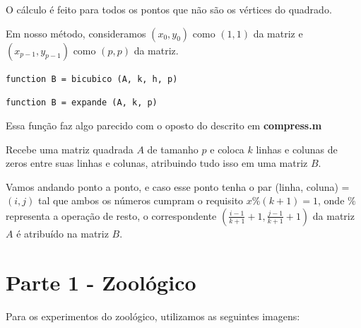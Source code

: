 \documentclass[12pt,letterpaper]{article}
\begin{document}
	O cálculo é feito para todos os pontos que não são os vértices do quadrado. 
	
	Em nosso método, consideramos $(x_0, y_0)$ como $(1, 1)$ da matriz e $(x_{p-1}, y_{p-1})$ como $(p, p)$ da matriz.
	 
	\begin{center}
		\texttt{function B = bicubico (A, k, h, p)}
	\end{center}
	
	\begin{center}
		\texttt{function B = expande (A, k, p)}
	\end{center}
	
	Essa função faz algo parecido com o oposto do descrito em \textbf{compress.m}
	
	Recebe uma matriz quadrada $A$ de tamanho $p$ e coloca $k$ linhas e colunas de zeros entre suas linhas e colunas, atribuindo tudo isso em uma matriz $B$. 
	
	Vamos andando ponto a ponto, e caso esse ponto tenha o par (linha, coluna) = $(i, j)$ tal que ambos os números cumpram o requisito $x\%(k+1)=1$, onde $\%$ representa a operação de resto, o correspondente $(\frac{i-1}{k+1}+1, \frac{j-1}{k+1}+1)$ da matriz $A$ é atribuído na matriz $B$.
	
	\section{Parte 1 - Zoológico}
	
	Para os experimentos do zoológico, utilizamos as seguintes imagens: 
	
	\begin{figure}[h]
	\end{figure}
	
\end{document}
